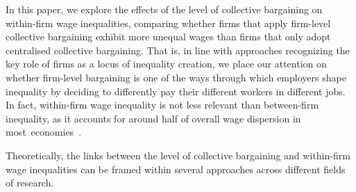\documentclass[12pt]{article}
\begin{document}
In this paper, we explore the effects of the level of collective
bargaining on within-firm wage inequalities, comparing whether firms
that apply firm-level collective bargaining exhibit more unequal wages
than firms that only adopt centralised collective bargaining. That is,
in line with approaches recognizing the key role of firms as a locus
of inequality creation, we place our attention on whether firm-level
bargaining is one of the ways through which employers shape inequality
by deciding to differently pay their different workers in different
jobs. In fact, within-firm wage inequality is not less relevant than
between-firm inequality, as it accounts for around half of overall
wage dispersion in
most~economies~\citep{lazear.shaw.2007,fournier.koske.2013,GlobalWageReport}.

Theoretically, the links between the level of collective bargaining
and within-firm wage inequalities can be framed within several
approaches across different fields of research.
\end{document}
